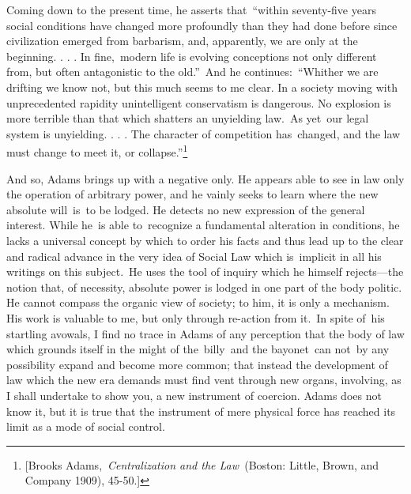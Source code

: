 \documentclass[openany,nobib]{tufte-book}
\begin{document}
\noindent Coming down to the present time, he asserts that~``within seventy-five
years social conditions have changed more profoundly than they had done
before since civilization emerged from barbarism, and, apparently, we
are only at the beginning. . . . In fine,~modern life is evolving
conceptions not only different from, but often antagonistic to the
old.''~And he continues:~``Whither we are drifting we know not, but this
much seems to me clear. In a society moving with unprecedented rapidity
unintelligent conservatism is dangerous. No explosion is more terrible
than that which shatters an unyielding law.~As yet~our legal system is
unyielding. . . . The character of competition has~changed, and the law
must change to meet it, or collapse.''\footnote{{[}Brooks
  Adams,~\emph{Centralization and the Law~}(Boston: Little, Brown, and
  Company 1909), 45-50.{]}}~

And so, Adams brings up with a negative only. He appears able to see in
law only the operation of arbitrary power, and he vainly seeks to learn
where the new absolute will~is~to be lodged. He detects no new
expression of the general interest. While he~is able to~recognize a
fundamental alteration in conditions, he lacks a universal concept by
which to order his facts and thus lead up to the clear and radical
advance in the very idea of Social Law which is~implicit in all his
writings on this subject.~He uses the tool of inquiry which he himself
rejects---the notion that, of necessity, absolute power is lodged in one
part of the body politic. He cannot compass the organic view of society;
to him, it is only a mechanism. His work is valuable to me, but only
through re-action from it.~In spite of~his startling avowals, I find no
trace in Adams of any perception that the body of law which grounds
itself in the might of the~billy~and the bayonet~can not~by any
possibility expand and become more common; that instead the development
of law which the new era demands must find vent through new organs,
involving, as I shall undertake to show you, a new instrument of
coercion. Adams does not know it, but it is true that the instrument of
mere physical force has reached its limit as a mode of social control.~
\end{document}
